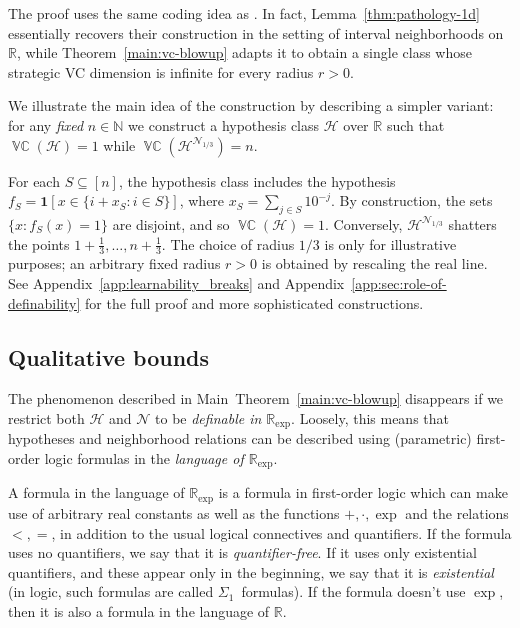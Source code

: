 \documentclass[11pt]{article}
\theoremstyle{plain}
\theoremstyle{definition}
\theoremstyle{remark}
\DeclareMathOperator{\VCdim}{\mathbb{VC}}
\begin{document}
The proof uses the same coding idea as \cite[Lemma~2]{montasser19}. 
In fact, Lemma~\ref{thm:pathology-1d} essentially recovers their construction in the setting of interval neighborhoods on \(\mathbb R\), while Theorem~\ref{main:vc-blowup} adapts it to obtain a single class whose strategic VC dimension is infinite for every radius \(r>0\).


We illustrate the main idea of the construction by describing a simpler variant: for any \emph{fixed} $n \in \mathbb{N}$ we construct a hypothesis class $\mathcal{H}$ over $\mathbb{R}$ such that $\VCdim(\mathcal H) = 1$ while $\VCdim(\mathcal H^{\mathcal N_{1/3}}) = n$. 

For each $S \subseteq [n]$, the hypothesis class includes the hypothesis $f_S = \mathbf{1}\!\left[ x \in \{ i + x_S : i \in S \} \right]$, where $x_S = \sum_{j \in S} 10^{-j}$. By construction, the sets $\{x: f_S(x)=1\}$ are disjoint, and so $\VCdim(\mathcal H) = 1$. Conversely, $\mathcal H^{\mathcal N_{1/3}}$ shatters the points $1+\frac{1}{3},\dots,n+\frac{1}{3}$. 
{The choice of radius \(1/3\) is only for illustrative purposes; an arbitrary fixed radius \(r>0\) is obtained by rescaling the real line.} 
See Appendix~\ref{app:learnability_breaks} and Appendix~\ref{app:sec:role-of-definability} for the full proof and more sophisticated constructions.


\medskip

\subsection{Qualitative bounds}
The phenomenon described in Main~Theorem~\ref{main:vc-blowup} disappears if we restrict both $\mathcal{H}$ and $\mathcal{N}$ to be \emph{definable in $\mathbb{R}_{\exp}$}.
Loosely, this means that hypotheses and neighborhood relations can be described
using (parametric) first-order logic formulas in the \emph{language of $\mathbb R_{\exp}$}.

A formula in the language of $\mathbb R_{\exp}$ is a formula in first-order logic which can make use of arbitrary real constants as well as the functions $+,\cdot,\exp$ and the relations $<,=$, in addition to the usual logical connectives and quantifiers. If the formula uses no quantifiers, we say that it is \emph{quantifier-free}. If it uses only existential quantifiers, and these appear only in the beginning, we say that it is \emph{existential} (in logic, such formulas are called $\Sigma_1$~formulas). If the formula doesn't use $\exp$, then it is also a formula in the language of $\mathbb R$.
\end{document}
